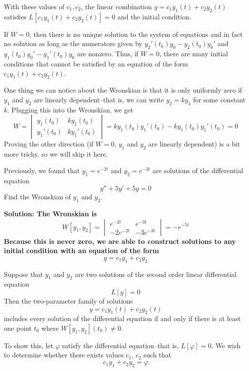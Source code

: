 With these values of $c_1, c_2$, the linear combination $y = c_1y_1(t) + c_2y_2(t)$ satisfies $L[c_1y_1(t) + c_2y_2(t)] = 0$ and the initial condition. \par
If $W=0$, then there is no unique solution to the system of equations and in fact no solution as long as the numerators given by $y_2'(t_0)y_0 - y_2(t_0)y_0'$ and $y_1(t_0)y_0' - y_1'(t_0)y_0$ are nonzero. Thus, if $W=0$, there are many initial conditions that cannot be satisfied by an equation of the form $c_1y_1(t) + c_2y_2(t)$. \par
One thing we can notice about the Wronskian is that it is only uniformly zero if $y_1$ and $y_2$ are linearly dependent--that is, we can write $y_2 = ky_1$ for some constant $k$. Plugging this into the Wronskian, we get
\[ W =
    \begin{vmatrix}
        y_1(t_0) & ky_1(t_0) \\
        y_1'(t_0) & ky_1'(t_0)
    \end{vmatrix} = ky_1(t_0)y_1'(t_0) - ky_1(t_0)y_1'(t_0) = 0
\]
Proving the other direction (if $W=0$, $y_1$ and $y_2$ are linearly dependent) is a bit more tricky, so we will skip it here. 
\begin{example}
    Previously, we found that $y_1 = e^{-2t}$ and $y_2 = e^{-3t}$ are solutions of the differential equation
    \[ y'' + 5y' + 5y = 0 \]
    Find the Wronskian of $y_1$ and $y_2$. \par
    \bf{Solution:} The Wronskian is
    \[ W[y_1, y_2] = \begin{vmatrix}
        e^{-2t} & e^{-3t} \\
        -2e^{-2t} & -3e^{-3t}
    \end{vmatrix} = -e^{-5t}\]
    Because this is never zero, we are able to construct solutions to any initial condition with an equation of the form
    \[ y = c_1y_1 + c_2y_2 \]
\end{example}
\begin{theorem}
    Suppose that $y_1$ and $y_2$ are two solutions of the second order linear differential equation
    \[ L[y] = 0 \]
    Then the two-parameter family of solutions
    \[ y = c_1y_1(t) + c_2y_2(t) \]
    includes every solution of the differential equation if and only if there is at least one point $t_0$ where $W[y_1, y_2](t_0) \neq 0$.
\end{theorem}
To show this, let $\varphi$ satisfy the differential equation--that is, $L[\varphi] = 0$. We wish to determine whether there exists values $c_1$, $c_2$ such that
\[ c_1y_1 + c_2y_2 = \varphi \]

